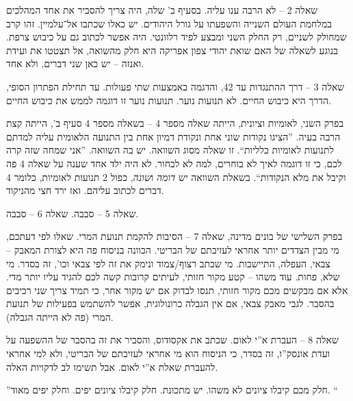 \documentclass[]{../../../../tex/classes/styledArticle}
\begin{document}
	שאלה 2 – לא הרבה ענו עליה. בסעיף ב' שלה, היה צריך להסביר את אחד המהלכים במלחמת העולם השנייה והשפעתו על גורל היהודים. יש כאלו שכתבו אל־עלמיין. זהו קרב שמחולק לשניים, רק החלק השני ומבצע לפיד רלוונטי. היה אפשר לכתוב גם על כיבוש צרפת. בנוגע לשאלה של האם שואת יהודי צפון אפריקה היא חלק מהשואה, אל תצטטו את ועידת ואנזה – יש כאן שני דברים, ולא אחד. 
	
	שאלה 3 – דרך ההתנגדות עד 42, והדגמה באמצעות שתי פעולות. עד תחילת הפתרון הסופי, הדרך היא כיבוש החיים. לא תנועות נוער. תנועות נוער זו דוגמה לממש את כיבוש החיים. 
	
	בפרק השני, לאומיות וציונית, הייתה שאלה מספר 4 – בשאלה מספר 4 סעיף ב', הייתה קצת הרבה בעיה. ''הציגו נקודות שוני אחת ונקודת דמיון אחת בין התנועה הלאומית עליה למדתם לתנועות לאומיות כלליות``. זו שאלה מסוג השוואה. יש בה השוואה. 
	''אני שמחה שזה קרה לכם, כי זו דוגמה לאיך לא בוחרים, למה לא לבחור. לא היה ילד אחד שענה על שאלה 4 פה וקיבל את מלא הנקודות``. בשאלת השוואה יש \textit{דומה} ו\textit{שונה}, כפול 2 תנועות לאומיות, כלומר 4 דברים לכתוב עליהם. ואז ירד חצי מהניקוד. 
	
	שאלה 5 – סבבה. שאלה 6 – סבבה. 
	
	בפרק השלישי של בונים מדינה, שאלה 7 – הסיבות להקמת תנועת המרי. שאלו לפי דעתכם, מי מבין הצדדים יותר אחראי לעזיבתם של הבריטי. הכוונה בניסוח פה היא לצורת המאבק – צבאי, העפלה, התיישבות. מי שכתב רצוף/צמוד ונימק את זה לפי צבאי וכו', זה בסדר. מי שלא, פחות. עוד משהו – קטע מקור חזותי, לעיתים קרובות קשה לכם להגיד עליו יותר מדי. אלא אם מבקשים מכם מקור חזותי, תנסו לבדוק אם יש מקור אחר, כי תמיד צריך שני רכיבים בהסבר. לגבי מאבק צבאי, אם אין הגבלה כרונולוגית, אפשר להשתמש בפעילות של תנועת המרי (פה לא הייתה הגבלה). 
	
	שאלה 8 – העברת א''י לאום. שכתב את אקסודוס, והסביר את זה בהסבר של ההשפעה על ועדת אונסק''ו, זה בסדר, כי הניסוח הוא מי אחראי לעזיבתם של הבריטי, ולא למי אחראי להעברת שאלת א''י לאום. אבל תשימו לב לדקויות האלה. 
	
	''חלק מכם קיבלו ציונים לא משהו. יש מתכונת. חלק קיבלו ציונים יפים. וחלק יפים מאוד. ``
	
	
\end{document}
